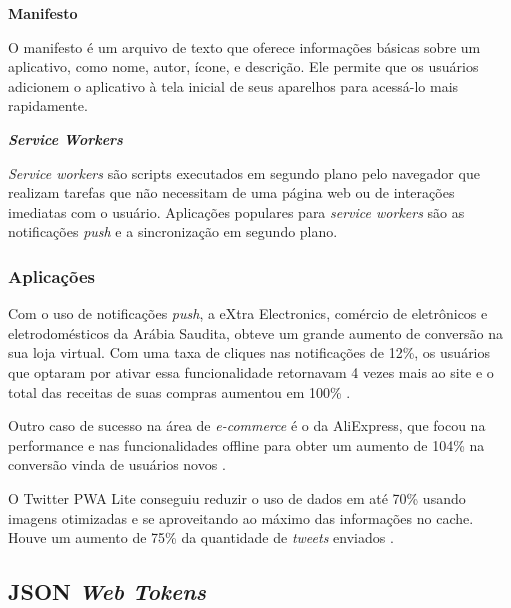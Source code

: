 \begin{description}

\item \textbf{Manifesto}

O manifesto é um arquivo de texto que oferece informações básicas sobre um aplicativo, como nome, autor, ícone, e descrição. Ele permite que os usuários adicionem o aplicativo à tela inicial de seus aparelhos para acessá-lo mais rapidamente.

\item \textbf{\textit{Service Workers}}

\textit{Service workers} são scripts executados em segundo plano pelo navegador que realizam tarefas que não necessitam de uma página web ou de interações imediatas com o usuário. Aplicações populares para \textit{service workers} são as notificações \textit{push} e a sincronização em segundo plano.

\end{description}

\subsubsection{Aplicações}
Com o uso de notificações \textit{push}, a eXtra Electronics, comércio de eletrônicos e eletrodomésticos da Arábia Saudita, obteve um grande aumento de conversão na sua loja virtual. Com uma taxa de cliques nas notificações de 12\%, os usuários que optaram por ativar essa funcionalidade retornavam 4 vezes mais ao site e o total das receitas de suas compras aumentou em 100\% \cite{googledevextra}.

Outro caso de sucesso na área de \textit{e-commerce} é o da AliExpress, que focou na performance e nas funcionalidades offline para obter um aumento de 104\% na conversão vinda de usuários novos \cite{googledevaliexpress}.

O Twitter PWA Lite conseguiu reduzir o uso de dados em até 70\% usando imagens otimizadas e se aproveitando ao máximo das informações no cache. Houve um aumento de 75\% da quantidade de \textit{tweets} enviados \cite{googledevtwitter}.

\subsection{JSON \textit{Web Tokens} \label{sec:JWT}}

